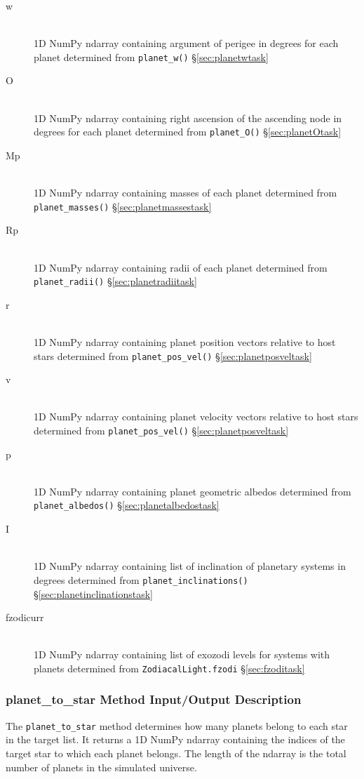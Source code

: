 \documentclass[cleanfoot]{asme2ej}
\begin{document}
\begin{itemize}
\begin{description}
        \item[w] \hfill \\
        1D NumPy ndarray containing argument of perigee in degrees for each planet determined from \verb+planet_w()+ \S\ref{sec:planetwtask}
        \item[O] \hfill \\
        1D NumPy ndarray containing right ascension of the ascending node in degrees for each planet determined from \verb+planet_O()+ \S\ref{sec:planetOtask}
        \item[Mp] \hfill \\
        1D NumPy ndarray containing masses of each planet determined from \verb+planet_masses()+ \S\ref{sec:planetmassestask}
        \item[Rp] \hfill \\
        1D NumPy ndarray containing radii of each planet determined from \verb+planet_radii()+ \S\ref{sec:planetradiitask}
        \item[r] \hfill \\
        1D NumPy ndarray containing planet position vectors relative to host stars determined from \verb+planet_pos_vel()+ \S\ref{sec:planetposveltask}
        \item[v] \hfill \\
        1D NumPy ndarray containing planet velocity vectors relative to host stars determined from \verb+planet_pos_vel()+ \S\ref{sec:planetposveltask}
        \item[p] \hfill \\
        1D NumPy ndarray containing planet geometric albedos determined from \verb+planet_albedos()+ \S\ref{sec:planetalbedostask}
        \item[I] \hfill \\
        1D NumPy ndarray containing list of inclination of planetary systems in degrees determined from \verb+planet_inclinations()+ \S\ref{sec:planetinclinationstask}
        \item[fzodicurr] \hfill \\
        1D NumPy ndarray containing list of exozodi levels for systems with planets determined from \verb+ZodiacalLight.fzodi+ \S\ref{sec:fzoditask}
    \end{description}
\end{itemize}

\subsubsection{planet\_to\_star Method Input/Output Description} \label{sec:planettostartask}
The \verb+planet_to_star+ method determines how many planets belong to each star in the target list.  It returns a 1D NumPy ndarray containing the indices of the target star to which each planet belongs.  The length of the ndarray is the total number of planets in the simulated universe.
\end{document}
